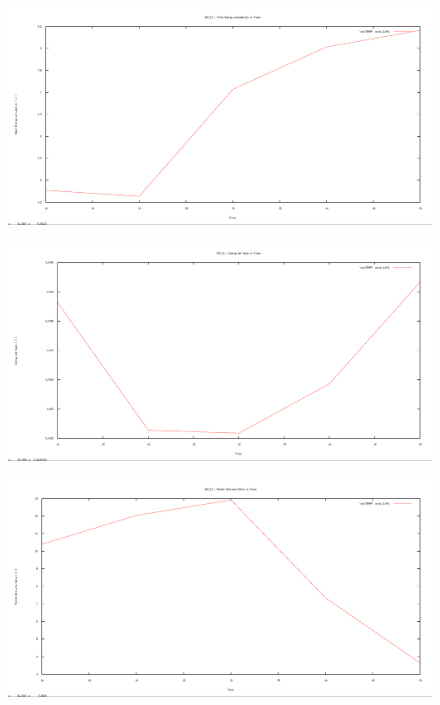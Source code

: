 \documentclass[12pt]{article}
\begin{document}
\begin{figure}[H]
	\centering
	\includegraphics[scale=	0.26]{image/802.15.4/Energyconsumption_vs_flows.png}
\end{figure}

\begin{figure}[H]
	\centering
	\includegraphics[scale=	0.26]{image/802.15.4/Energyperbytes_vs_flows.png}
\end{figure}

\begin{figure}[H]
	\centering
	\includegraphics[scale=	0.26]{image/802.15.4/Packetdeliveryratio_vs_flows.png}
\end{figure}
\end{document}
